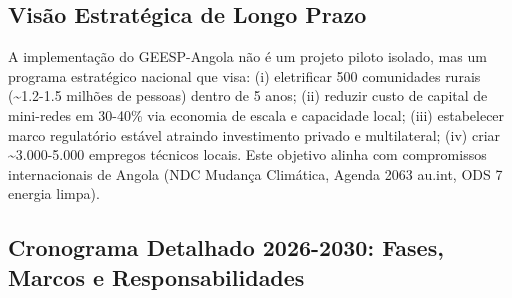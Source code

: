 \documentclass[12pt, a4paper]{article}
\begin{document}
\subsection{Visão Estratégica de Longo Prazo}

A implementação do GEESP-Angola não é um projeto piloto isolado, mas um programa estratégico nacional que visa: (i) eletrificar 500 comunidades rurais (\textasciitilde{}1.2-1.5 milhões de pessoas) dentro de 5 anos; (ii) reduzir custo de capital de mini-redes em 30-40\% via economia de escala e capacidade local; (iii) estabelecer marco regulatório estável atraindo investimento privado e multilateral; (iv) criar \textasciitilde{}3.000-5.000 empregos técnicos locais. Este objetivo alinha com compromissos internacionais de Angola (NDC Mudança Climática, Agenda 2063 au.int, ODS 7 energia limpa).

\subsection{Cronograma Detalhado 2026-2030: Fases, Marcos e Responsabilidades}
\end{document}
